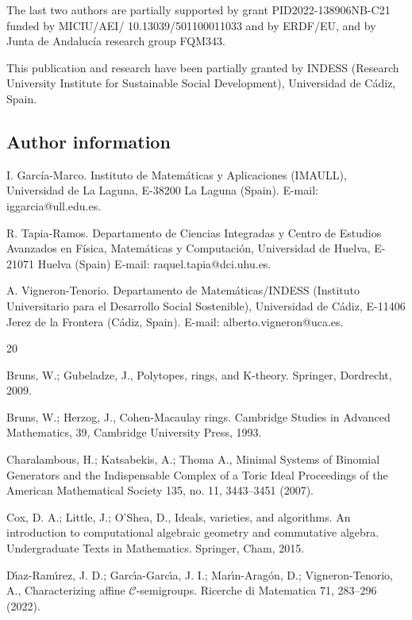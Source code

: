 \documentclass[a4paper,11pt]{article}
\def\CaC{\mathcal{C}}
\begin{document}
{The last two authors are partially supported by grant PID2022-138906NB-C21 funded by MICIU/AEI/ 10.13039/501100011033 and by ERDF/EU, and by Junta de Andalucía research group FQM343.

This publication and research have been partially granted by INDESS (Research University Institute for Sustainable Social Development), Universidad de Cádiz, Spain.

\subsection*{Author information}

I. García-Marco. Instituto de Matemáticas y Aplicaciones (IMAULL), Universidad de La Laguna, E-38200 La Laguna (Spain). E-mail: iggarcia@ull.edu.es.

\medskip

\noindent
R. Tapia-Ramos. Departamento de Ciencias Integradas y Centro de Estudios Avanzados en Física, Matemáticas y Computación, Universidad de Huelva, E-21071  Huelva (Spain)
E-mail: raquel.tapia@dci.uhu.es.

\medskip

\noindent
A. Vigneron-Tenorio. Departamento de Matem\'aticas/INDESS (Instituto Universitario para el Desarrollo Social Sostenible), Universidad de C\'adiz, E-11406 Jerez de la Frontera (C\'{a}diz, Spain).
E-mail: alberto.vigneron@uca.es.

\begin{thebibliography}{20}

Bruns, W.; Gubeladze, J.,
\newblock Polytopes, rings, and K-theory.
 Springer, Dordrecht, 2009.

Bruns, W.; Herzog, J.,
\newblock Cohen-Macaulay rings.
\newblock  Cambridge Studies in Advanced Mathematics, 39, Cambridge University Press, 1993.

Charalambous, H.; Katsabekis, A.;  Thoma A.,
\newblock  Minimal Systems of Binomial Generators and the Indispensable Complex of a Toric Ideal
\newblock Proceedings of the American Mathematical Society 135, no. 11, 3443--3451 (2007).


Cox, D. A.; Little, J.; O'Shea, D.,
\newblock Ideals, varieties, and algorithms. An introduction to computational algebraic geometry and commutative algebra.
\newblock Undergraduate Texts in Mathematics. Springer, Cham, 2015.

D\'{\i}az-Ram\'{\i}rez, J. D.; Garc\'{\i}a-Garc\'{\i}a, J. I.; Mar\'{\i}n-Arag\'{o}n, D.; Vigneron-Tenorio, A.,
\newblock Characterizing affine $\CaC$-semigroups.
\newblock Ricerche di Matematica 71, 283--296 (2022).


\end{thebibliography}}
\end{document}
